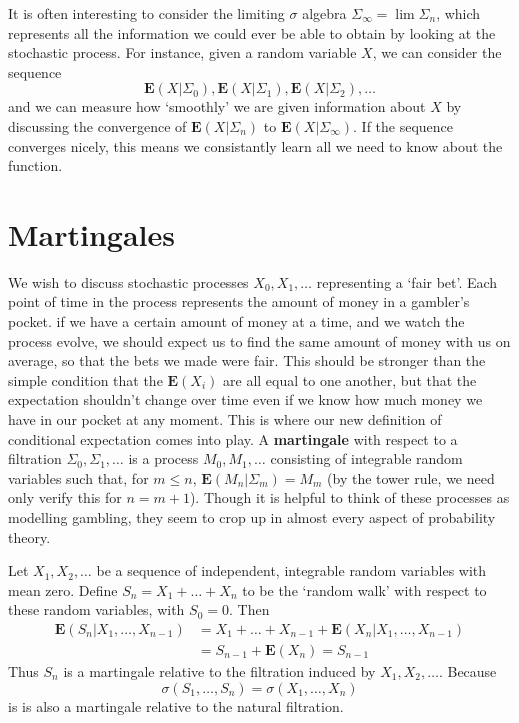 It is often interesting to consider the limiting $\sigma$ algebra $\Sigma_\infty = \lim \Sigma_n$, which represents all the information we could ever be able to obtain by looking at the stochastic process. For instance, given a random variable $X$, we can consider the sequence
%
\[ \mathbf{E}(X|\Sigma_0), \mathbf{E}(X|\Sigma_1), \mathbf{E}(X|\Sigma_2), \dots \]
%
and we can measure how `smoothly' we are given information about $X$ by discussing the convergence of $\mathbf{E}(X|\Sigma_n)$ to $\mathbf{E}(X|\Sigma_\infty)$. If the sequence converges nicely, this means we consistantly learn all we need to know about the function.

\section{Martingales}

We wish to discuss stochastic processes $X_0, X_1, \dots$ representing a `fair bet'. Each point of time in the process represents the amount of money in a gambler's pocket. if we have a certain amount of money at a time, and we watch the process evolve, we should expect us to find the same amount of money with us on average, so that the bets we made were fair. This should be stronger than the simple condition that the $\mathbf{E}(X_i)$ are all equal to one another, but that the expectation shouldn't change over time even if we know how much money we have in our pocket at any moment. This is where our new definition of conditional expectation comes into play. A {\bf martingale} with respect to a filtration $\Sigma_0, \Sigma_1, \dots$ is a process $M_0, M_1, \dots$ consisting of integrable random variables such that, for $m \leq n$, $\mathbf{E}(M_n | \Sigma_m) = M_m$ (by the tower rule, we need only verify this for $n = m+1$). Though it is helpful to think of these processes as modelling gambling, they seem to crop up in almost every aspect of probability theory.

\begin{example}
    Let $X_1, X_2, \dots$ be a sequence of independent, integrable random variables with mean zero. Define $S_n = X_1 + \dots + X_n$ to be the `random walk' with respect to these random variables, with $S_0 = 0$. Then
    \begin{align*}
        \mathbf{E}(S_n|X_1, \dots, X_{n-1}) &= X_1 + \dots + X_{n-1} + \mathbf{E}(X_n|X_1, \dots, X_{n-1})\\
        &= S_{n-1} + \mathbf{E}(X_n) = S_{n-1}
    \end{align*}
    Thus $S_n$ is a martingale relative to the filtration induced by $X_1, X_2, \dots$. Because
    \[ \sigma(S_1, \dots, S_n) = \sigma(X_1, \dots, X_n) \]
    is is also a martingale relative to the natural filtration.
\end{example}

